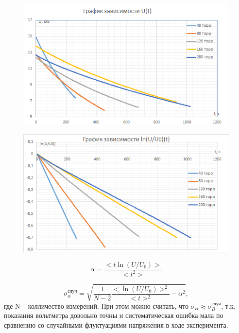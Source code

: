 \documentclass[12pt,a4paper]{article}
\begin{document}
\begin{figure}[H]
	\begin{center}
		\includegraphics[width=14cm]{2.2.1_gr_1}
	\end{center}
	\label{ris6}
\end{figure}


\begin{figure}[H]
	\begin{center}
		\includegraphics[width=14cm]{2.2.1_gr_2}
	\end{center}
	\label{ris7}
\end{figure}

\begin{equation}
\alpha=\frac{<t\ln (U/U_{0})>}{<t^2>}
\end{equation}

\begin{equation}
\sigma^\text{случ}_{\alpha} = \sqrt{\frac{1}{N-2} \frac{<\ln (U/U_{0})>^2}{<t>^2} - {\alpha}^2},
\end{equation}
где N -- колличество измерений. При этом можно считать, что $ \sigma_B \approx \sigma_B^\text{случ} $, т.к. показания вольтметра довольно точны и систематическая ошибка мала по сравнению со случайными флуктуациями напряжения в ходе эксперимента.
\end{document}

